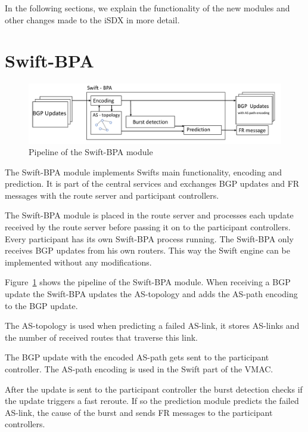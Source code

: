 In the following sections, we explain the functionality of the new modules and other changes made to the iSDX in more detail.

\newpage

\section{\label{chapter4:Swift-BPA}Swift-BPA}

\begin{figure}[h]
\center
\includegraphics[scale = 0.5]{Figures/design_swift_bpa_cropped.pdf}
\caption{Pipeline of the Swift-BPA module}
\label{fig:PipelineBPA}
\end{figure}

The Swift-BPA module implements Swifts main functionality, encoding and prediction. It is part of the central services and exchanges BGP updates and FR messages with the route server and participant controllers.

The Swift-BPA module is placed in the route server and processes each update received by the route server before passing it on to the participant controllers. 
Every participant has its own Swift-BPA process running. The Swift-BPA only receives BGP updates from his own routers. This way the Swift engine can be implemented without any modifications.

Figure~\ref{fig:PipelineBPA} shows the pipeline of the Swift-BPA module. When receiving a BGP update the Swift-BPA updates the AS-topology and adds the AS-path encoding to the BGP update. 

The AS-topology is used when predicting a failed AS-link, it stores AS-links and the number of received routes that traverse this link.

The BGP update with the encoded AS-path gets sent to the participant controller. The AS-path encoding is used in the Swift part of the VMAC.
 
After the update is sent to the participant controller the burst detection checks if the update triggers a fast reroute. If so the prediction module predicts the failed AS-link, the cause of the burst and sends FR messages to the participant controllers. 

